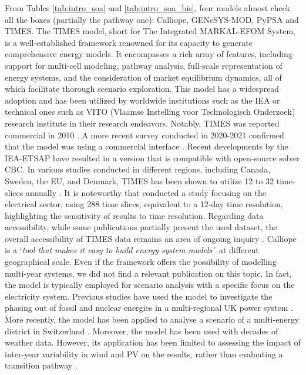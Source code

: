 From Tables \ref{tab:intro_soa} and \ref{tab:intro_soa_bis}, four models almost check all the boxes (partially the pathway one): Calliope, GENeSYS-MOD, PyPSA and TIMES. 
The TIMES model, short for The Integrated MARKAL-EFOM System, is a well-established framework renowned for its capacity to generate comprehensive energy models. It encompasses a rich array of features, including support for multi-cell modeling, pathway analysis, full-scale representation of energy systems, and the consideration of market equilibrium dynamics, all of which facilitate thorough scenario exploration. This model has a widespread adoption and has been utilized by worldwide institutions such as the \gls{IEA} or technical ones such as VITO (Vlaamse Instelling voor Technologisch Onderzoek) research institute in their research endeavors. Notably, TIMES was reported commercial in 2010 \cite{Connolly2010}. A more recent survey conducted in 2020-2021 confirmed that the model was using a commercial interface \cite{chang2021trends}. Recent developments by the IEA-ETSAP have resulted in a version that is compatible with open-source solver CBC. In various studies conducted in different regions, including Canada, Sweden, the EU, and Denmark, TIMES has been shown to utilize 12 to 32 time-slices annually \cite{prina2020classification}. It is noteworthy that \citet{haydt2011relevance} conducted a study focusing on the electrical sector, using 288 time slices, equivalent to a 12-day time resolution, highlighting the sensitivity of results to time resolution. Regarding data accessibility, while some publications partially present the used dataset, the overall accessibility of TIMES data remains an area of ongoing inquiry \cite{openmod_times_description}. 
 Calliope is a `\emph{tool that makes it easy to build energy system models}´ at different geographical scale. Even if the framework offers the possibility of modelling multi-year systems, we did not find a relevant publication on this topic. In fact, the model is typically employed for scenario analysis with a specific focus on the electricity system. Previous studies have used the model to investigate the phasing out of fossil and nuclear energies in a multi-regional UK power system \cite{pfenninger2015renewables}. More recently, the model has been applied to analyse a scenario of a multi-energy district in Switzerland \cite{pickering2021quantifying}. Moreover, the model has been used with decades of weather data. However, its application has been limited to assessing the impact of inter-year variability in wind and PV on the results, rather than evaluating a transition pathway \cite{pfenninger2017dealing}. 
